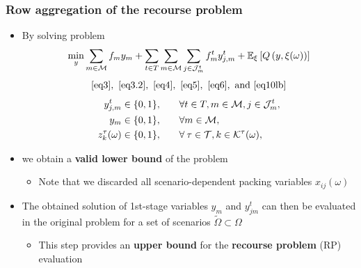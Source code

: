 \documentclass[,9pt,xcolor={dvipsnames}]{beamer} %
\begin{document}
\begin{frame}%
	\frametitle{Row aggregation of the recourse problem}
	\begin{itemize}
		\item<1-> By solving problem
		{
		\small
		\begin{equation*}
		\min_{y} \sum\limits_{m \in \cal M} {f_{m}}y_{m} +  \sum\limits_{t \in T} \sum\limits_{m \in {{\cal M}}} \sum\limits_{j \in {\cal J}_{m}^t} f_{m}^t y_{j,m}^t  + {\mathbb{E}}_{\xi}\left[Q \left(y,\xi(\omega)\right)\right] 
		\end{equation*}
		\begin{equation*}
			\eqref{eq3},~\eqref{eq3.2},~\eqref{eq4},~\eqref{eq5},~\eqref{eq6},~\text{and}~\eqref{eq10lb}
		\end{equation*}
		\begin{alignat*}{2}
		y_{j,m}^t \in \{0, 1\}, & \qquad \forall t \in T, m \in {\cal M}, j \in {\cal J}^t_{m}, \\
		y_{m} \in \{0, 1\}, & \qquad \forall m \in \cal M, \\
		z_k^{\tau}(\omega) \in \{0, 1\}, & \qquad \forall \: \tau \in {\cal T}, k \in {\cal K}^{\tau}(\omega),
		\end{alignat*}
		}
        \item<2->{we obtain a \textbf{valid lower bound} of the problem}
        \begin{itemize}
		      \item<3-> Note that we discarded all scenario-dependent packing variables $ x_{ij}(\omega)$
        \end{itemize}
		\bigskip
		\item<4-> The obtained solution of 1st-stage variables $ y_m$ and $y^t_{jm}$ can then be evaluated in the original problem for a set of scenarios $ \tilde{\Omega} \subset \Omega$
		\begin{itemize}
			\item<5-> This step provides an \textbf{upper bound} for the \textbf{recourse problem} (RP) evaluation
		\end{itemize}
	\end{itemize}
\end{frame}
\end{document}
